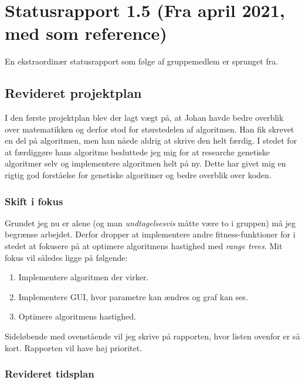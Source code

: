 
\section{Statusrapport 1.5 (Fra april 2021, med som reference)} \label{sec:status-report-1.5}

En ekstraordinær statusrapport som følge af gruppemedlem er sprunget fra. 

\subsection{Revideret projektplan}

I den første projektplan blev der lagt vægt på, at Johan havde bedre overblik
over matematikken og derfor stod for størstedelen af algoritmen. Han fik skrevet
en del på algoritmen, men han nåede aldrig at skrive den helt færdig. I stedet
for at færdiggøre hans algoritme besluttede jeg mig for at researche genetiske
algoritmer selv og implementere algoritmen helt på ny. Dette har givet mig en
rigtig god forståelse for genetiske algoritmer og bedre overblik over koden. 

\subsubsection{Skift i fokus}

Grundet jeg nu er alene (og man \textit{undtagelsesvis} måtte være to i gruppen)
må jeg begrænse arbejdet. Derfor dropper at implementere andre
fitness-funktioner for i stedet at fokusere på at optimere algoritmens
hastighed med \textit{range trees}. Mit fokus vil således ligge på følgende: 

\begin{enumerate}
    \item Implementere algoritmen der virker.  
    \item Implementere GUI, hvor parametre kan ændres og graf kan ses. 
    \item Optimere algoritmens hastighed. 
\end{enumerate}

Sideløbende med ovenstående vil jeg skrive på rapporten, hvor listen ovenfor er
så kort. Rapporten vil have høj prioritet. 

\subsubsection{Revideret tidsplan}

